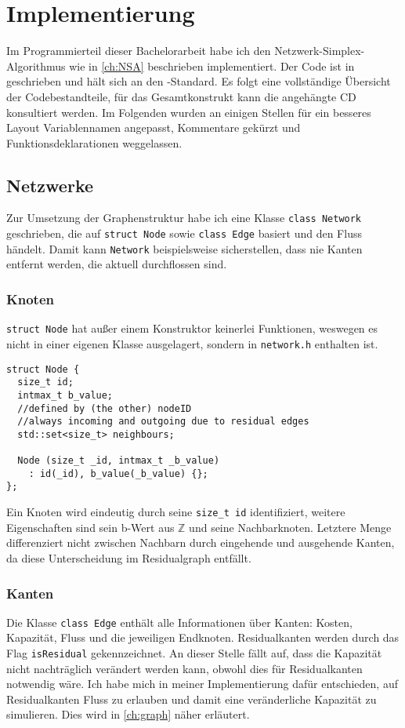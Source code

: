 \chapter{Implementierung} \label{ch:prog}
Im Programmierteil dieser Bachelorarbeit habe ich den Netzwerk-Simplex-Algorithmus wie in \cref{ch:NSA} beschrieben implementiert. Der Code ist in \cpp geschrieben und hält sich an den \cppelf-Standard. Es folgt eine vollständige Übersicht der Codebestandteile, für das Gesamtkonstrukt kann die angehängte CD konsultiert werden. Im Folgenden wurden an einigen Stellen für ein besseres Layout Variablennamen angepasst, Kommentare gekürzt und Funktionsdeklarationen weggelassen.

\section{Netzwerke}
Zur Umsetzung der Graphenstruktur habe ich eine Klasse \lstinline|class Network| geschrieben, die auf \lstinline|struct Node| sowie \lstinline|class Edge| basiert und den Fluss händelt. Damit kann \lstinline|Network| beispielsweise sicherstellen, dass nie Kanten entfernt werden, die aktuell durchflossen sind.

\subsection{Knoten}
\lstinline|struct Node| hat außer einem Konstruktor keinerlei Funktionen, weswegen es nicht in einer eigenen Klasse ausgelagert, sondern in \lstinline|network.h| enthalten ist. 

\begin{lstlisting}
struct Node {
  size_t id;
  intmax_t b_value;
  //defined by (the other) nodeID
  //always incoming and outgoing due to residual edges
  std::set<size_t> neighbours;

  Node (size_t _id, intmax_t _b_value)
    : id(_id), b_value(_b_value) {};
};
\end{lstlisting}

Ein Knoten wird eindeutig durch seine \lstinline|size_t id| identifiziert, weitere Eigenschaften sind sein b-Wert aus $\mathbb{Z}$ und seine Nachbarknoten. Letztere Menge differenziert nicht zwischen Nachbarn durch eingehende und ausgehende Kanten, da diese Unterscheidung im Residualgraph entfällt.

\subsection{Kanten}
Die Klasse \lstinline|class Edge| enthält alle Informationen über Kanten: Kosten, Kapazität, Fluss und die jeweiligen Endknoten. Residualkanten werden durch das Flag \lstinline|isResidual| gekennzeichnet. An dieser Stelle fällt auf, dass die Kapazität nicht nachträglich verändert werden kann, obwohl dies für Residualkanten notwendig wäre. Ich habe mich in meiner Implementierung dafür entschieden, auf Residualkanten Fluss zu erlauben und damit eine veränderliche Kapazität zu simulieren. Dies wird in \cref{ch:graph} näher erläutert.

